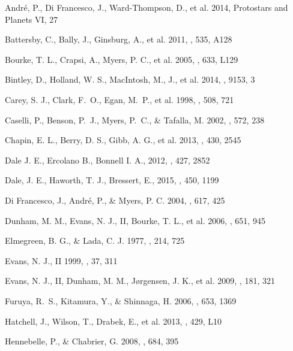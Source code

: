 \documentclass[manuscript]{aastex}
\begin{document}
\begin{thebibliography}{99}

Andr{\'e}, P., Di Francesco, J., Ward-Thompson, D., et al.
2014, Protostars and Planets VI, 27

Battersby, C., Bally, J., Ginsburg, A., et al.
2011, \aap, 535, A128

Bourke, T. L., Crapsi, A., Myers, P. C., et al.
2005, \apjl, 633, L129

Bintley, D., Holland, W. S., MacIntosh, M., J., et al. 
2014, \procspie, 9153, 3

Carey, S. J., Clark, F.~O., Egan, M.~P., et al.
1998, \apj, 508, 721

Caselli, P., Benson, P.~J., Myers, P.~C., \& Tafalla, M.
2002, \apj, 572, 238

Chapin, E. L., Berry, D. S., Gibb, A. G., et al. 
2013, \mnras, 430, 2545

Dale J. E., Ercolano B., Bonnell I. A.,
2012, \mnras, 427, 2852

Dale, J. E., Haworth, T. J., Bressert, E.,
2015, \mnras, 450, 1199

Di Francesco, J., Andr{\'e}, P., \& Myers, P. C.
2004, \apj, 617, 425

Dunham, M. M., Evans, N. J., II, Bourke, T. L., et al.
2006, \apj, 651, 945

Elmegreen, B. G., \& Lada, C. J.
1977, \apj, 214, 725

Evans, N. J., II
1999, \araa, 37, 311

Evans, N. J., II, Dunham, M. M., J{\o}rgensen, J. K., et al.
2009, \apjs, 181, 321

Furuya, R.~S., Kitamura, Y., \& Shinnaga, H.
2006, \apj, 653, 1369

Hatchell, J., Wilson, T., Drabek, E., et al.
2013, \mnras , 429, L10

Hennebelle, P., \& Chabrier, G.
2008, \apj, 684, 395


\end{thebibliography}
\end{document}
